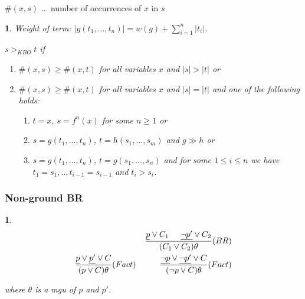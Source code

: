\documentclass[9pt]{extarticle}
\theoremstyle{theoremstyle}
\newtheorem*{green}{}
\newtheorem*{blue}{}
\begin{document}
\begin{multicols}{3}
\begin{minipage}[t]{.30\textwidth}
$\#(x,s)$ ... number of occurrences of $x$ in $s$

\begin{green}
Weight of term: $|g(t_1,...,t_n)| = w(g) + \sum_{i=1}^{n}|t_i|$.

$s >_{KBO} t$ if
\begin{enumerate}
	\item $\#(x,s) \geq \#(x,t)$ for all variables $x$ and $|s|>|t|$ or
	\item $\#(x,s) \geq \#(x,t)$ for all variables $x$ and $|s|=|t|$ and one of the following holds:
	\begin{enumerate}
		\item $t=x$, $s=f^n(x)$ for some $n\geq 1$ or
		\item $s=g(t_1,...,t_n)$, $t=h(s_1,...,s_m)$ and $g \gg h$ or
		\item $s=g(t_1,...,t_n)$, $t=g(s_1,...,s_n)$ and for some $1\leq i \leq n$ we have $t_1=s_1,.., t_{i-1}=s_{i-1}$ and $t_i > s_i$.
	\end{enumerate}
\end{enumerate}
\end{green}

\subsubsection*{Non-ground BR}
\begin{blue}
\begin{align*}
	\frac{\underline{p}\lor C_1 \hspace{.5cm} \underline{\lnot p'} \lor C_2}{(C_1 \lor C_2)\theta} (BR)\\
	\frac{\underline{p}\lor \underline{p'} \lor C}{(p \lor C)\theta} (Fact) \hspace{1cm} \frac{\underline{\lnot p}\lor \underline{\lnot p'} \lor C}{(\lnot p \lor C)\theta} (Fact)
\end{align*}

where $\theta$ is a mgu of $p$ and $p'$.
\end{blue}


\end{minipage}
\end{multicols}
\end{document}
